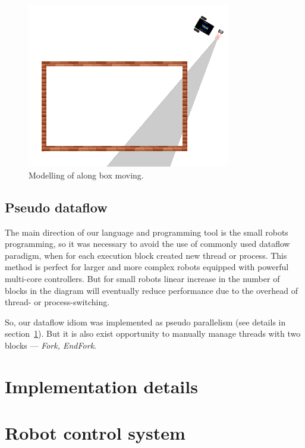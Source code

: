 \documentclass[conference,compsoc]{IEEEtran}
\begin{document}
\begin{figure}[ht]
	\centering
	\includegraphics[width=3.5in]{alongBoxModel.png}
	\caption{Modelling of along box moving.}
	\label{image:box}
\end{figure}



\subsection{Pseudo dataflow}
The main direction of our language and programming tool is the small robots programming, so it was necessary to avoid the use of commonly used dataflow paradigm, when for each execution block created new thread or process. This method is perfect for larger and more complex robots equipped with powerful multi-core controllers. But for small robots linear increase in the number of blocks in the diagram will eventually reduce performance due to the overhead of thread- or process-switching.

So, our dataflow idiom was implemented as pseudo parallelism (see details in section~\ref{sec:impl}). But it is also exist opportunity to manually manage threads with two blocks --- \textit{Fork, EndFork}.

\section{Implementation details}	
\label{sec:impl}

\section{Robot control system}	
\label{sec:robotControl}
\end{document}
